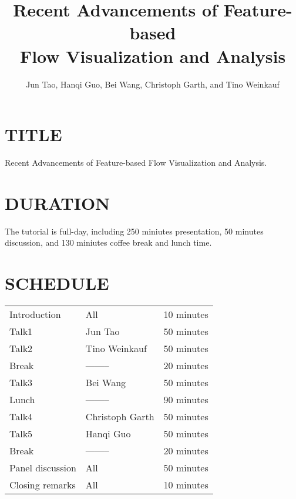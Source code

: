 \documentclass[preprint,journal]{vgtc}       %
\title{Recent Advancements of Feature-based\\ Flow Visualization and Analysis}
\author{Jun Tao, Hanqi Guo, Bei Wang, Christoph Garth, and Tino Weinkauf}
\begin{document}


\maketitle

\section*{TITLE}
Recent Advancements of Feature-based Flow Visualization and Analysis.

\section*{DURATION}
The tutorial is full-day, including 250 miniutes presentation, 50 minutes discussion, and 130 miniutes coffee break and lunch time.

\section*{SCHEDULE}

\vspace{-0.1in}
\begin{table}[H]
\begin{tabular}{lll}
Introduction & All & 10 minutes\\
Talk1 & Jun Tao & 50 minutes\\
Talk2 & Tino Weinkauf & 50 minutes\\
Break & -------- & 20 minutes\\
Talk3 & Bei Wang & 50 minutes\\
Lunch & -------- & 90 minutes\\
Talk4 & Christoph Garth & 50 minutes\\
Talk5 & Hanqi Guo & 50 minutes\\
Break & -------- & 20 minutes\\
Panel discussion & All & 50 minutes\\
Closing remarks & All & 10 minutes
\end{tabular}
\end{table}
\end{document}
